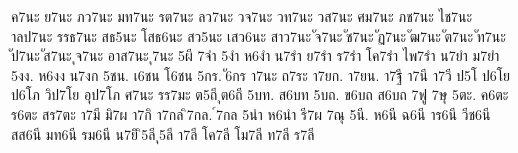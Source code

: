 {ค7นะ
ย7นะ
ภว7นะ
มท7นะ
รต7นะ
ลว7นะ
วจ7นะ
วท7นะ
วส7นะ
ศม7นะ
ภช7นะ
ไช7นะ
าลป7นะ
รรธ7นะ
สธ5นะ
โสธ6นะ
สว5นะ
เสว6นะ
สาว7นะ
ัจ7นะ
ัช7นะ
ัฏ7นะ
ัฒ7นะ
ัต7นะ
ัท7นะ
ัป7นะ
ัส7นะ
ุจ7นะ
อาส7นะ
ุ7นะ
5ผี
7จำ
5งำ
ห6งำ
น7รำ
ย7รำ
ร7รำ
โค7รำ
ไพ7รำ
น7ยำ
ม7ยำ
5งง.
ห6งง
น7งก
5ชน.
เ6ชน
โ6ชน
5กร.
ั6กร
า7นะ
ถ7ระ
า7ยก.
า7ยน.
า7ฐี
า7นี
า7วี
ป5โ
ป6โย
ป6โภ
วิป7โย
อุป7โภ
ศ7นะ
รร7มะ
ต5ถี
ุต6ถี
5บท.
ส6บท
5บถ.
ข6บถ
ส6บถ
7ฟู
7ษุ
5ตะ.
ค6ตะ
ร6ตะ
สร7ตะ
า7มี
มิ7ผ
า7กิ
า7กล
ิ7กล.
์7กล
5นำ
ห6นำ
รี7ผ
7ณุ
5นี.
ห6นี
ฉ6นี
าร6นี
วีช6นี
สส6นี
มท6นี
รม6นี
น7ยิ
ิ5ลี
ุ5ลี
า7ลี
โค7ลี
โม7ลี
ท7ลี
ร7ลี
}
